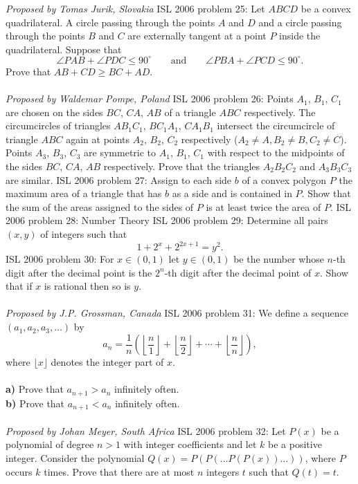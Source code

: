\textit{Proposed by Tomas Jurik, Slovakia} 
ISL 2006 problem 25:  Let $ABCD$ be a convex quadrilateral. A circle passing through the points $A$ and $D$ and a circle passing through the points $B$ and $C$ are externally tangent at a point $P$ inside the quadrilateral. Suppose that
\[
\angle{PAB}+\angle{PDC}\leq  90^\circ\qquad\text{and}\qquad\angle{PBA}+\angle{PCD}\leq  90^\circ.
\]
Prove that $AB+CD \geq  BC+AD$. \\\\
\textit{Proposed by Waldemar Pompe, Poland} 
ISL 2006 problem 26:  Points $ A_1$, $ B_1$, $ C_1$ are chosen on the sides $ BC$, $ CA$, $ AB$ of a triangle $ ABC$ respectively. The circumcircles of triangles $ AB_1C_1$, $ BC_1A_1$, $ CA_1B_1$ intersect the circumcircle of triangle $ ABC$ again at points $ A_2$, $ B_2$, $ C_2$ respectively  ($ A_2\neq A, B_2\neq B, C_2\neq C$).  Points $ A_3$, $ B_3$, $ C_3$ are symmetric to $ A_1$, $ B_1$, $ C_1$ with respect to the midpoints of the sides $ BC$, $ CA$, $ AB$ respectively. Prove that the triangles $ A_2B_2C_2$ and $ A_3B_3C_3$ are similar. 
ISL 2006 problem 27:  Assign to each side $b$ of a convex polygon $P$ the maximum area of a triangle that has $b$ as a side and is contained in $P$. Show that the sum of the areas assigned to the sides of $P$ is at least twice the area of $P$. 
ISL 2006 problem 28:  Number Theory 
ISL 2006 problem 29:  Determine all pairs $(x, y)$ of integers such that
\[ 1+2^x+2^{2x+1}= y^2. \] 
ISL 2006 problem 30:  For $ x \in (0, 1)$ let $ y \in (0, 1)$ be the number whose $ n$-th digit after the decimal point is the $ 2^n$-th digit after the decimal point of $ x$. Show that if $ x$ is rational then so is $ y$. \\\\
\textit{Proposed by J.P. Grossman, Canada} 
ISL 2006 problem 31:  We define a sequence $ \left(a_1,a_2,a_3,\ldots \right)$ by
\[
a_n = \frac {1}{n}\left(\left\lfloor\frac {n}{1}\right\rfloor + \left\lfloor\frac {n}{2}\right\rfloor + \cdots + \left\lfloor\frac {n}{n}\right\rfloor\right),
\]
where $\lfloor x\rfloor$ denotes the integer part of $x$. \\\\
\textbf{a)} Prove that $a_{n+1}>a_n$ infinitely often. \\
\textbf{b)} Prove that $a_{n+1}<a_n$ infinitely often. \\\\
\textit{Proposed by Johan Meyer, South Africa} 
ISL 2006 problem 32:  Let $P(x)$ be a polynomial of degree $n > 1$ with integer coefficients and let $k$ be a positive integer. Consider the polynomial $Q(x) = P(P(\ldots P(P(x)) \ldots ))$, where $P$ occurs $k$ times. Prove that there are at most $n$ integers $t$ such that $Q(t) = t$. 
